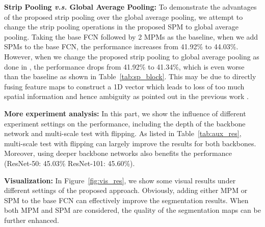 \documentclass[final]{cvpr}
\newcommand{\newparam}[1]{\vspace{5pt}\noindent\textbf{#1}}
\begin{document}
\newparam{Strip Pooling \emph{v.s.} Global Average Pooling:} 
To demonstrate the advantages of the proposed strip pooling over the global average pooling, we attempt to change the strip pooling operations in the proposed SPM to global average pooling.
Taking the base FCN followed by 2 MPMs as
the baseline, when we add SPMs to the base FCN,
the performance increases from 41.92\% to 44.03\%.
However, when we change the proposed strip pooling 
to global average pooling as done 
in \cite{hu2018squeeze},
the performance drops from 41.92\% to 41.34\%,
which is even worse than the baseline
as shown in Table~\ref{tab:sp_block}.
This may be due to directly 
fusing feature maps to construct
a 1D vector which leads to loss of too much spatial information and hence ambiguity as pointed out in the previous work \cite{zhao2016pyramid}.

\newparam{More experiment analysis:} In this part, we
show the influence of different experiment settings on the performance, including the depth of the backbone network
and multi-scale test with flipping.
As listed in Table~\ref{tab:aux_res}, multi-scale test with flipping
can largely improve the results for both backbones.
Moreover, using deeper backbone networks also benefits the performance (ResNet-50: 45.03\%  ResNet-101: 45.60\%).



\newparam{Visualization:}
In Figure~\ref{fig:vis_res}, we show some visual results under
different settings of the proposed approach.
Obviously, adding either MPM or SPM to the base FCN can 
effectively improve the segmentation results.
When both MPM and SPM are considered, the quality of the
segmentation maps can be further enhanced.
\end{document}
